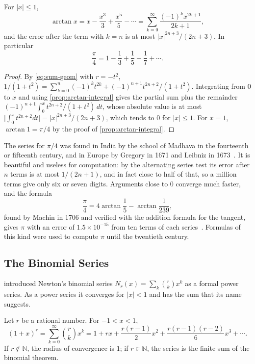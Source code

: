 \begin{theorem}
\label{thm:arctan-series}
For $|x|\le1$,
\[
\arctan x=x-\frac{x^3}3+\frac{x^5}5-\cdots=\sum_{k=0}^\infty\frac{(-1)^kx^{2k+1}}{2k+1},
\]
and the error after the term with $k=n$ is at most $|x|^{2n+3}/(2n+3)$. In particular
\[
\frac\pi4=1-\frac13+\frac15-\frac17+\cdots .
\]
\end{theorem}

\begin{proof}
By \eqref{eq:sum-geom} with $r=-t^2$, $1/(1+t^2)=\sum_{k=0}^n(-1)^kt^{2k}+(-1)^{n+1}t^{2n+2}/(1+t^2)$. Integrating from $0$ to $x$ and using \cref{prop:arctan-integral} gives the partial sum plus the remainder $(-1)^{n+1}\int_0^xt^{2n+2}/(1+t^2)\,dt$, whose absolute value is at most $\bigl|\int_0^xt^{2n+2}dt\bigr|=|x|^{2n+3}/(2n+3)$, which tends to $0$ for $|x|\le1$. For $x=1$, $\arctan1=\pi/4$ by the proof of \cref{prop:arctan-integral}.
\end{proof}

The series for $\pi/4$ was found in India by the school of Madhava in the fourteenth or fifteenth century, and in Europe by Gregory in 1671 and Leibniz in 1673~\cite{roy1990,edwards1979}. It is beautiful and useless for computation: by the alternating series test its error after $n$ terms is at most $1/(2n+1)$, and in fact close to half of that, so a million terms give only six or seven digits. Arguments close to $0$ converge much faster, and the formula
\[
\frac\pi4=4\arctan\frac15-\arctan\frac1{239},
\]
found by Machin in 1706 and verified with the addition formula for the tangent, gives $\pi$ with an error of $1.5\times10^{-15}$ from ten terms of each series~\cite{berggren2004pi}. Formulas of this kind were used to compute $\pi$ until the twentieth century.

\subsection{The Binomial Series}

 introduced Newton's binomial series $N_r(x)=\sum_k\binom rkx^k$ as a formal power series. As a power series it converges for $|x|<1$ and has the sum that its name suggests.

\begin{theorem}
\label{thm:binomial-series}
Let $r$ be a rational number. For $-1<x<1$,
\[
(1+x)^r=\sum_{k=0}^\infty\binom rkx^k=1+rx+\frac{r(r-1)}2x^2+\frac{r(r-1)(r-2)}6x^3+\cdots .
\]
If $r\notin\mathbb N$, the radius of convergence is $1$; if $r\in\mathbb N$, the series is the finite sum of the binomial theorem.
\end{theorem}

